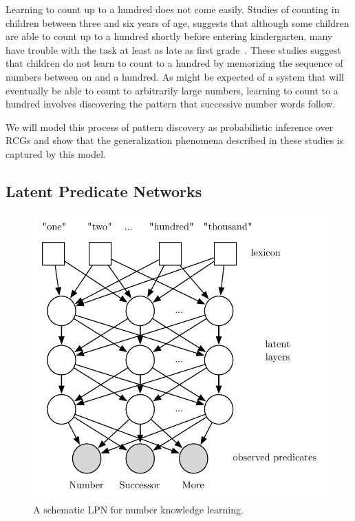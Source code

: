 \documentclass[10pt,letterpaper]{article}
\begin{document}
Learning to count up to a hundred does not come easily. Studies of
counting in children between three and six years of age, suggests that
although some children are able to count up to a hundred shortly
before entering kindergarten, many have trouble with the task at least
as late as first
grade~\cite{FusRicBriar1982,miller1987counting}. These studies suggest
that children do not learn to count to a hundred by memorizing the
sequence of numbers between on and a hundred. As might be expected of
a system that will eventually be able to count to arbitrarily large
numbers, learning to count to a hundred involves discovering the
pattern that successive number words follow. 

We will model this process of pattern discovery as probabilistic
inference over RCGs and show that the generalization phenomena
described in these studies is captured by this model. 

\subsection{Latent Predicate Networks}

\begin{figure}[t]
\includegraphics[width=0.9\linewidth]{figures/lpn}
\caption{A schematic LPN for number knowledge learning.}
\end{figure}
\end{document}
